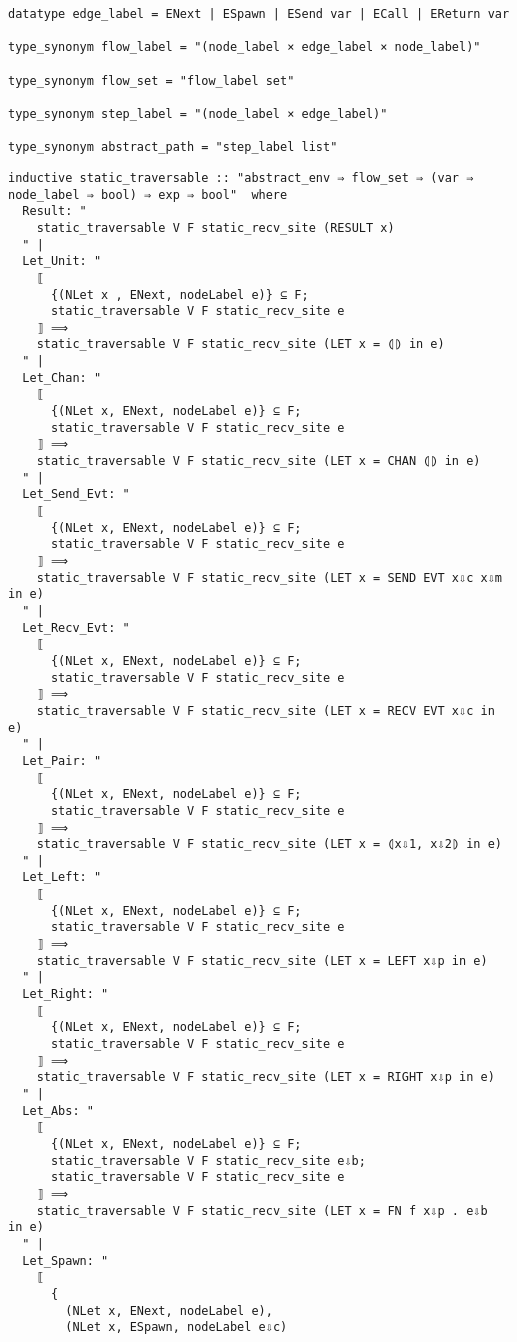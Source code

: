 \documentclass{article}
\begin{document}
\begin{lstlisting}[style=codestyle1, escapechar=\%]
datatype edge_label = ENext | ESpawn | ESend var | ECall | EReturn var

type_synonym flow_label = "(node_label × edge_label × node_label)"

type_synonym flow_set = "flow_label set"

type_synonym step_label = "(node_label × edge_label)"

type_synonym abstract_path = "step_label list"
  \end{lstlisting}

\begin{lstlisting}[style=codestyle1, escapechar=\%]
  inductive static_traversable :: "abstract_env ⇒ flow_set ⇒ (var ⇒ node_label ⇒ bool) ⇒ exp ⇒ bool"  where
  Result: "
    static_traversable V F static_recv_site (RESULT x)
  " |
  Let_Unit: "
    ⟦
      {(NLet x , ENext, nodeLabel e)} ⊆ F;
      static_traversable V F static_recv_site e
    ⟧ ⟹
    static_traversable V F static_recv_site (LET x = ⦇⦈ in e)
  " |
  Let_Chan: "
    ⟦
      {(NLet x, ENext, nodeLabel e)} ⊆ F;
      static_traversable V F static_recv_site e
    ⟧ ⟹
    static_traversable V F static_recv_site (LET x = CHAN ⦇⦈ in e)
  " |
  Let_Send_Evt: "
    ⟦
      {(NLet x, ENext, nodeLabel e)} ⊆ F;
      static_traversable V F static_recv_site e
    ⟧ ⟹
    static_traversable V F static_recv_site (LET x = SEND EVT x⇩c x⇩m in e)
  " |
  Let_Recv_Evt: "
    ⟦
      {(NLet x, ENext, nodeLabel e)} ⊆ F;
      static_traversable V F static_recv_site e
    ⟧ ⟹
    static_traversable V F static_recv_site (LET x = RECV EVT x⇩c in e)
  " |
  Let_Pair: "
    ⟦
      {(NLet x, ENext, nodeLabel e)} ⊆ F;
      static_traversable V F static_recv_site e
    ⟧ ⟹
    static_traversable V F static_recv_site (LET x = ⦇x⇩1, x⇩2⦈ in e)
  " |
  Let_Left: "
    ⟦
      {(NLet x, ENext, nodeLabel e)} ⊆ F;
      static_traversable V F static_recv_site e
    ⟧ ⟹
    static_traversable V F static_recv_site (LET x = LEFT x⇩p in e)
  " |
  Let_Right: "
    ⟦
      {(NLet x, ENext, nodeLabel e)} ⊆ F;
      static_traversable V F static_recv_site e
    ⟧ ⟹
    static_traversable V F static_recv_site (LET x = RIGHT x⇩p in e)
  " |
  Let_Abs: "
    ⟦
      {(NLet x, ENext, nodeLabel e)} ⊆ F;
      static_traversable V F static_recv_site e⇩b;
      static_traversable V F static_recv_site e
    ⟧ ⟹
    static_traversable V F static_recv_site (LET x = FN f x⇩p . e⇩b  in e)
  " |
  Let_Spawn: "
    ⟦
      {
        (NLet x, ENext, nodeLabel e),
        (NLet x, ESpawn, nodeLabel e⇩c)

\end{lstlisting}
\end{document}
